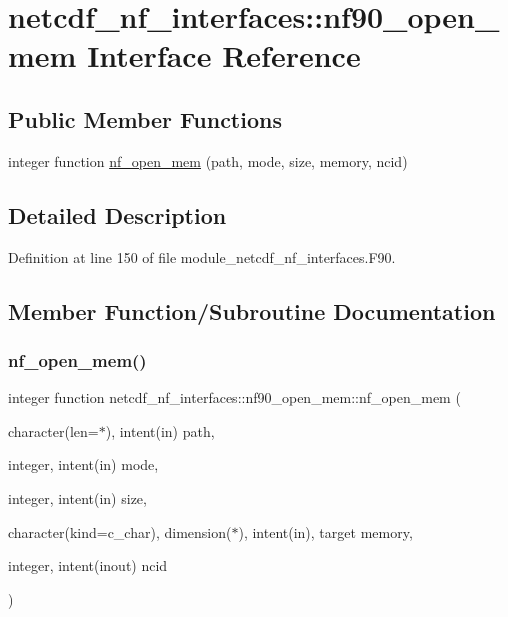 \hypertarget{interfacenetcdf__nf__interfaces_1_1nf90__open__mem}{}\section{netcdf\+\_\+nf\+\_\+interfaces\+:\+:nf90\+\_\+open\+\_\+mem Interface Reference}
\label{interfacenetcdf__nf__interfaces_1_1nf90__open__mem}
\subsection*{Public Member Functions}
\begin{DoxyCompactItemize}
\item 
integer function \hyperlink{interfacenetcdf__nf__interfaces_1_1nf90__open__mem_a546ec9f2bbe3446d052ba43153b5fea1}{nf\+\_\+open\+\_\+mem} (path, mode, size, memory, ncid)
\end{DoxyCompactItemize}


\subsection{Detailed Description}


Definition at line 150 of file module\+\_\+netcdf\+\_\+nf\+\_\+interfaces.\+F90.



\subsection{Member Function/\+Subroutine Documentation}
\mbox{\label{interfacenetcdf__nf__interfaces_1_1nf90__open__mem_a546ec9f2bbe3446d052ba43153b5fea1}} 
\subsubsection{\texorpdfstring{nf\+\_\+open\+\_\+mem()}{nf\_open\_mem()}}
{\footnotesize\ttfamily integer function netcdf\+\_\+nf\+\_\+interfaces\+::nf90\+\_\+open\+\_\+mem\+::nf\+\_\+open\+\_\+mem (\begin{DoxyParamCaption}\item[{character(len=$\ast$), intent(in)}]{path,  }\item[{integer, intent(in)}]{mode,  }\item[{integer, intent(in)}]{size,  }\item[{character(kind=c\+\_\+char), dimension($\ast$), intent(in), target}]{memory,  }\item[{integer, intent(inout)}]{ncid }\end{DoxyParamCaption})}



